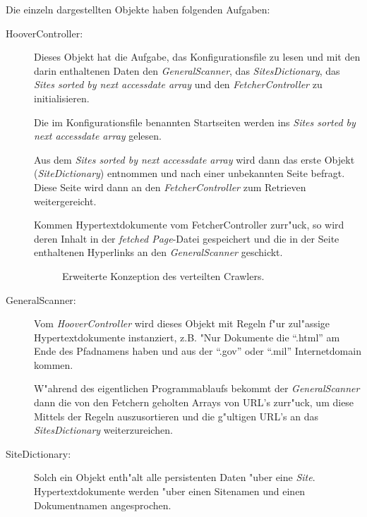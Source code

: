 Die einzeln dargestellten Objekte haben folgenden Aufgaben:
\begin{description}
\item[HooverController:] Dieses Objekt hat die Aufgabe, das Konfigurationsfile zu lesen und mit den darin enthaltenen Daten den {\em GeneralScanner}, das {\em SitesDictionary}, das {\em Sites sorted by next accessdate array} und den {\em FetcherController} zu initialisieren.

Die im Konfigurationsfile benannten Startseiten werden ins {\em Sites sorted by next accessdate array} gelesen.

Aus dem {\em Sites sorted by next accessdate array} wird dann das erste Objekt ({\em SiteDictionary}) entnommen und nach einer unbekannten Seite befragt. Diese Seite wird dann an den {\em FetcherController} zum Retrieven weitergereicht.

Kommen Hypertextdokumente vom FetcherController zurr"uck, so wird deren Inhalt in der {\em fetched Page}-Datei gespeichert und die in der Seite enthaltenen Hyperlinks an den {\em GeneralScanner} geschickt.

\begin{figure}[t]
	\caption{Erweiterte Konzeption des verteilten Crawlers.}
	\label{HooverDritterUeberblick}
\end{figure}

\item[GeneralScanner:]	Vom {\em HooverController} wird dieses Objekt mit Regeln f"ur zul"assige Hypertextdokumente  instanziert, z.B. "Nur Dokumente die "`.html"' am Ende des Pfadnamens haben und aus der "`.gov"' oder "`.mil"' Internetdomain kommen.

W"ahrend des eigentlichen Programmablaufs bekommt der {\em GeneralScanner} dann die von den Fetchern geholten Arrays von URL's zurr"uck, um diese Mittels der Regeln auszusortieren und die g"ultigen URL's an das {\em SitesDictionary} weiterzureichen.


\item[SiteDictionary:] Solch ein Objekt enth"alt alle persistenten Daten "uber eine {\em Site}. Hypertextdokumente werden "uber einen Sitenamen und einen Dokumentnamen angesprochen. 


\end{description}
